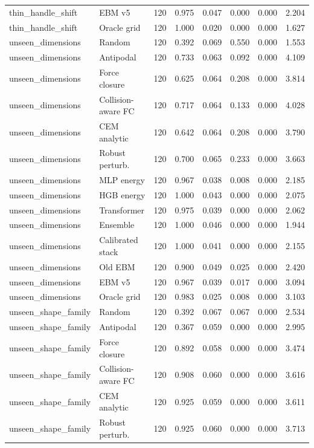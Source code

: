 {\begin{longtable}{llrrrrrr}
thin\_handle\_shift & EBM v5 & 120 & 0.975 & 0.047 & 0.000 & 0.000 & 2.204 \\
thin\_handle\_shift & Oracle grid & 120 & 1.000 & 0.020 & 0.000 & 0.000 & 1.627 \\
unseen\_dimensions & Random & 120 & 0.392 & 0.069 & 0.550 & 0.000 & 1.553 \\
unseen\_dimensions & Antipodal & 120 & 0.733 & 0.063 & 0.092 & 0.000 & 4.109 \\
unseen\_dimensions & Force closure & 120 & 0.625 & 0.064 & 0.208 & 0.000 & 3.814 \\
unseen\_dimensions & Collision-aware FC & 120 & 0.717 & 0.064 & 0.133 & 0.000 & 4.028 \\
unseen\_dimensions & CEM analytic & 120 & 0.642 & 0.064 & 0.208 & 0.000 & 3.790 \\
unseen\_dimensions & Robust perturb. & 120 & 0.700 & 0.065 & 0.233 & 0.000 & 3.663 \\
unseen\_dimensions & MLP energy & 120 & 0.967 & 0.038 & 0.008 & 0.000 & 2.185 \\
unseen\_dimensions & HGB energy & 120 & 1.000 & 0.043 & 0.000 & 0.000 & 2.075 \\
unseen\_dimensions & Transformer & 120 & 0.975 & 0.039 & 0.000 & 0.000 & 2.062 \\
unseen\_dimensions & Ensemble & 120 & 1.000 & 0.046 & 0.000 & 0.000 & 1.944 \\
unseen\_dimensions & Calibrated stack & 120 & 1.000 & 0.041 & 0.000 & 0.000 & 2.155 \\
unseen\_dimensions & Old EBM & 120 & 0.900 & 0.049 & 0.025 & 0.000 & 2.420 \\
unseen\_dimensions & EBM v5 & 120 & 0.967 & 0.039 & 0.017 & 0.000 & 3.094 \\
unseen\_dimensions & Oracle grid & 120 & 0.983 & 0.025 & 0.008 & 0.000 & 3.103 \\
unseen\_shape\_family & Random & 120 & 0.392 & 0.067 & 0.067 & 0.000 & 2.534 \\
unseen\_shape\_family & Antipodal & 120 & 0.367 & 0.059 & 0.000 & 0.000 & 2.995 \\
unseen\_shape\_family & Force closure & 120 & 0.892 & 0.058 & 0.000 & 0.000 & 3.474 \\
unseen\_shape\_family & Collision-aware FC & 120 & 0.908 & 0.060 & 0.000 & 0.000 & 3.616 \\
unseen\_shape\_family & CEM analytic & 120 & 0.925 & 0.059 & 0.000 & 0.000 & 3.611 \\
unseen\_shape\_family & Robust perturb. & 120 & 0.925 & 0.060 & 0.000 & 0.000 & 3.713 \\

\end{longtable}}
